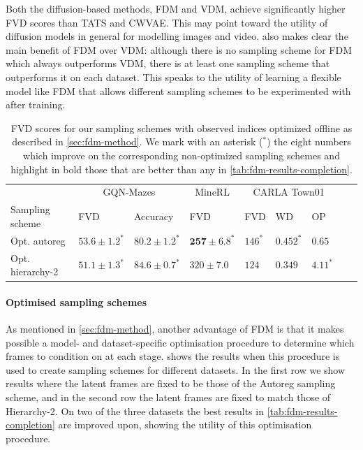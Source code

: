 Both the diffusion-based methods, FDM and VDM, achieve significantly higher FVD scores than TATS and CWVAE. This may point toward the utility of diffusion models in general for modelling images and video.  also makes clear the main benefit of FDM over VDM: although there is no sampling scheme for FDM which always outperforms VDM, there is at least one sampling scheme that outperforms it on each dataset. This speaks to the utility of learning a flexible model like FDM that allows different sampling schemes to be experimented with after training.

\begin{table} %
  \small
  \caption{FVD scores for our sampling schemes with observed indices optimized offline as described in \cref{sec:fdm-method}.  We mark with an asterisk ($^*$) the eight numbers which improve on the corresponding non-optimized sampling schemes and highlight in bold those that are better than any in \cref{tab:fdm-results-completion}.}
  \vspace{2mm}
  \label{tab:fdm-optimized}
  \centering
  \begin{tabular}{lllllllll}
    \toprule
     & \multicolumn{2}{c}{GQN-Mazes}  & \multicolumn{1}{c}{MineRL}  & \multicolumn{3}{c}{CARLA Town01} \\
    \cmidrule(r){2-3} \cmidrule(r){4-4} \cmidrule(r){5-7}
    Sampling scheme       & FVD     & Accuracy    &    FVD & FVD & WD & OP \\
    \midrule
    Opt. autoreg        & $53.6 \pm 1.2^*$            & $80.2 \pm 1.2^*$            & $\mathbf{257 \pm 6.8}^*$    &   $146^*$ & $0.452^*$ & $0.65$   \\
    Opt. hierarchy-2   & $\mathbf{51.1 \pm 1.3}^*$    & $\mathbf{84.6 \pm 0.7}^*$   & $320 \pm 7.0$    &   $124$ & $0.349$ & $4.11^*$   \\
    \bottomrule
  \end{tabular}
\end{table}

\paragraph{Optimised sampling schemes}
As mentioned in \cref{sec:fdm-method}, another advantage of FDM is that it makes possible a model- and dataset-specific optimisation procedure to determine which frames to condition on at each stage.  shows the results when this procedure is used to create sampling schemes for different datasets. In the first row we show results where the latent frames are fixed to be those of the Autoreg sampling scheme, and in the second row the latent frames are fixed to match those of Hierarchy-2. On two of the three datasets the best results in \cref{tab:fdm-results-completion} are improved upon, showing the utility of this optimisation procedure.

